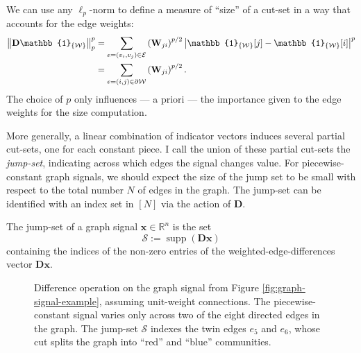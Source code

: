 We can use any $\ell_p$-norm to define a measure of ``size'' of a cut-set in a way that accounts for the edge weights:
\begin{align*}
    \left\| \mathbf{D} \mathbb{1}_{\{ \mathcal{W} \}} \right\|_p^p & = \sum_{e = (v_i,v_j) \in \E} \left( \mathbf{W}_{ji} \right)^{p/2} \left | \mathbb{1}_{\{ \mathcal{W} \}}[j] - \mathbb{1}_{\{ \mathcal{W} \}}[i] \right |^p \\
    & = \sum_{e = (i,j) \in \partial \mathcal{W}} \left( \mathbf{W}_{ji} \right)^{p/2}.
\end{align*}
The choice of $p$ only influences --- a priori --- the importance given to the edge weights for the size computation.

More generally, a linear combination of indicator vectors induces several partial cut-sets, one for each constant piece. I call the union of these partial cut-sets the \emph{jump-set}, indicating across which edges the signal changes value. For piecewise-constant graph signals, we should expect the size of the jump set to be small with respect to the total number $N$ of edges in the graph. The jump-set can be identified with an index set in $[N]$ via the action of $\mathbf{D}$.

\begin{definition}
    The jump-set of a graph signal $\mathbf{x} \in \mathbb{R}^{n}$ is the set
    \begin{equation}
        \mathcal{S} := \operatorname{supp}\left ( \mathbf{Dx} \right )
    \end{equation}
    containing the indices of the non-zero entries of the weighted-edge-differences vector $\mathbf{Dx}$.
    \label{def:jump_set}
\end{definition}

\begin{figure}[H]
    \centering
    
    \caption[Difference operation on the graph signal]{Difference operation on the graph signal from Figure \ref{fig:graph-signal-example}, assuming unit-weight connections. The piecewise-constant signal varies only across two of the eight directed edges in the graph. The jump-set $\mathcal{S}$ indexes the twin edges $e_5$ and $e_6$, whose cut splits the graph into ``red'' and ``blue'' communities.}
    \label{fig:jump-set-example}
\end{figure}

